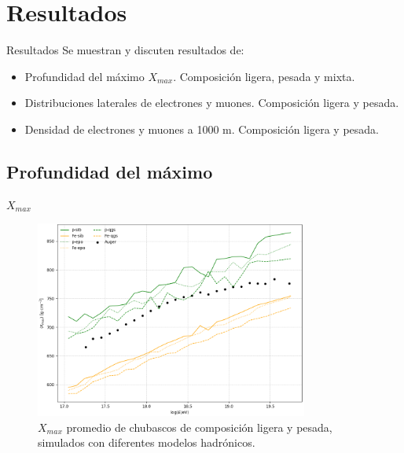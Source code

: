 \documentclass[11pt,table,compress]{beamer}
\begin{document}
\section{Resultados}
\begin{frame}{Resultados}
Se muestran y discuten resultados de: \vspace{5 mm}
	\begin{itemize}
	\item Profundidad del máximo $X_{max}$. Composición ligera, pesada y mixta. \vspace{3 mm}
	\item Distribuciones laterales de electrones y muones. Composición ligera y pesada.\vspace{3 mm}
	\item Densidad de electrones y muones a 1000 m. Composición ligera y pesada.
	\end{itemize}
 \end{frame}

	\subsection[$X_{max}$]{Profundidad del máximo}
	\begin{frame}{$X_{max}$}
		\begin{figure}
		\centering
		\includegraphics[width=0.8\textwidth]{Figuras/Xmax_pFe} 
		\caption{$X_{max}$ promedio de chubascos de composición ligera y pesada, simulados con diferentes modelos hadrónicos.}
		\end{figure}
	\end{frame}
	
\end{document}
